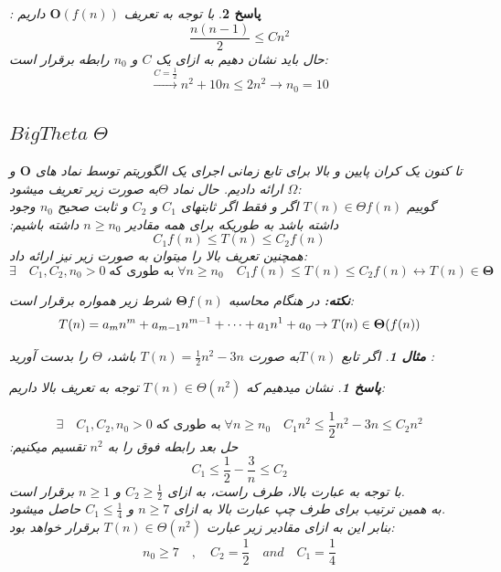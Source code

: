 \documentclass[12pt]{article}
\newtheorem{question}{مثال}[section]
\newtheorem{answer}{پاسخ}[section]
\newcommand{\func}{$T(n)$}
\begin{document}
\begin{answer}
با توجه به تعریف  $\mathbf{O}(f(n))$ داریم :
\[
\frac{n(n-1)}{2} \le Cn^2
\]
حال باید  نشان دهیم به ازای یک $C$ و $n_0$ رابطه برقرار است:
\[
\xrightarrow{C=\frac12} n^2 + 10n \le 2n^2 \rightarrow n_0 = 10
\]
\newpage



\subsection{$Big Theta \; \Theta$}

تا کنون یک کران پایین و بالا برای تابع زمانی اجرای یک الگوریتم توسط نماد های $\mathbf{O}$ و $\Omega$ ارائه دادیم. حال نماد $\Theta$به صورت زیر تعریف میشود:\\
گوییم  $T(n) \in \Theta f(n)$ اگر و فقط اگر ثابتهای $C_1$ و $C_2$ و ثابت صحیح $n_0$ وجود داشته باشد به طوریکه برای همه مقادیر $n \ge n_0$ داشته باشیم:
\[
C_1f(n) \le T(n) \le C_2f(n)
\]
\noindent
همچنین تعریف بالا را میتوان به صورت زیر نیز ارائه داد:
\[
\exists \quad C_1,C_2,n_0 > 0\; \text{به طوری که} \;\forall n\ge n_0 \quad C_1f(n) \le T(n) \le C_2f(n) \leftrightarrow T(n) \in \mathbf{\Theta}  
\]

\noindent
\textbf{نکته:}
در هنگام محاسبه $\mathbf{\Theta}f(n)$ شرط زیر همواره برقرار است:
\[
T(n) = a_mn^m + a_{m-1}n^{m-1}+ \dots + a_1n^1+a_0\\
\rightarrow T(n) \in \mathbf{\Theta} (f(n))
\]

\begin{question}
اگر تابع \func  به صورت $T(n) = \frac12 n^2 - 3n$ باشد، \textbf{$\Theta$} را بدست آورید :
\end{question}

\begin{answer}
نشان میدهیم که $T(n) \in \Theta (n^2)$ توجه به تعریف بالا داریم:

\[
\exists \quad C_1,C_2,n_0 > 0\; \text{به طوری که} \;\forall n\ge n_0 \quad C_1 n^2 \le \frac12 n^2 - 3n \le C_2n^2
\]
حل بعد رابطه فوق را به $n^2$ تقسیم میکنیم:
\[
C_1 \le \frac12 - \frac3n \le C_2
\]
با توجه به عبارت بالا، طرف راست، به ازای $C_2 \ge \frac12$
و $n\ge 1$ برقرار است.\\
به همین ترتیب برای طرف چپ عبارت بالا به ازای $n \ge 7$ و $C_1 \le \frac14$ حاصل میشود.\\
بنابر این به ازای مقادیر زیر عبارت $T(n) \in \Theta(n^2)$
برقرار خواهد بود:
\[n_0 \ge 7 \quad , \quad C_2 = \frac12 \quad and \quad C_1 = \frac14 \]
\end{answer}


\end{answer}
\end{document}
